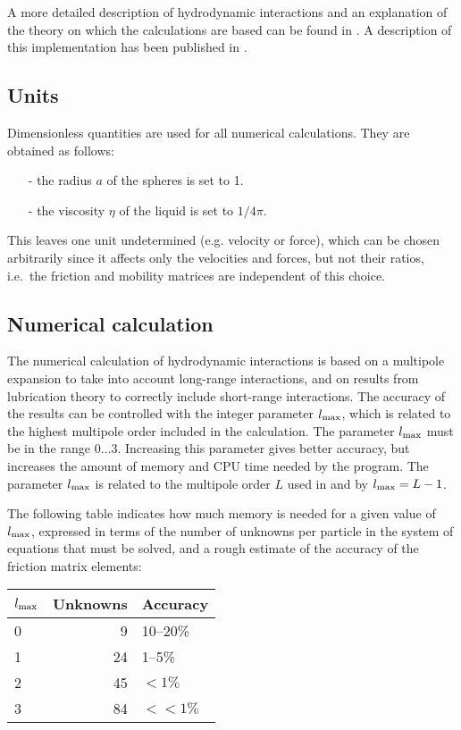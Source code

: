 A more detailed description of hydrodynamic interactions and an explanation
of the theory on which the calculations are based can be found in
\cite{cifehiwabl}. A description of this implementation has been
published in \cite{hi1}.

\subsection{Units}

Dimensionless quantities are used for all numerical calculations.
They are obtained as follows:
\begin{itemize}
\item[-] the radius $a$ of the spheres is set to 1.
\item[-] the viscosity $\eta$ of the liquid is set to $1/4\pi$.
\end{itemize}
This leaves one unit undetermined (e.g. velocity or force), which can
be chosen arbitrarily since it affects only the velocities and forces,
but not their ratios, i.e.\ the friction and mobility matrices are
independent of this choice.

\subsection{Numerical calculation}
\label{sec:numcalc}

The numerical calculation of hydrodynamic interactions is based on a
multipole expansion to take into account long-range interactions, and
on results from lubrication theory to correctly include short-range
interactions. The accuracy of the results can be controlled with the
integer parameter $l_{\rm max}$, which is related to the highest
multipole order included in the calculation. The parameter $l_{\rm
max}$ must be in the range $0\ldots 3$. Increasing this parameter
gives better accuracy, but increases the amount of memory and CPU time
needed by the program. The parameter $l_{\rm max}$ is related to
the multipole order $L$ used in \cite{cifehiwabl} and \cite{hi}
by $l_{\rm max} = L-1$.

The following table indicates how much memory is needed for a given
value of $l_{\rm max}$, expressed in terms of the number of unknowns
per particle in the system of equations that must be solved, and a
rough estimate of the accuracy of the friction matrix elements:

\begin{center}
\begin{tabular}{|l|r|l|}
\hline
$l_{\rm max}$ & Unknowns & Accuracy\\
\hline
0 & 9 & 10--20\% \\
1 & 24 & 1--5\% \\
2 & 45 & $< 1\%$ \\
3 & 84 & $<< 1\%$ \\
\hline
\end{tabular}
\end{center}

